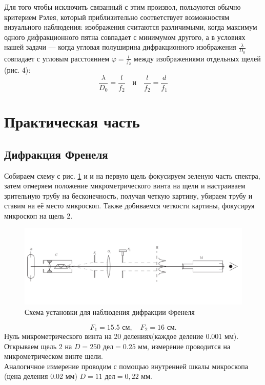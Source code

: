 \documentclass[a4paper, 12pt]{article}
\begin{document}
	Для того чтобы исключить связанный с этим произвол, пользуются обычно критерием Рэлея, который приблизительно соответствует возможностям визуального наблюдения: изображения считаются различимыми, когда максимум одного дифракционного пятна совпадает с минимумом другого, а в условиях нашей задачи — когда угловая полуширина дифракционного изображения $\frac{\lambda}{D_0}$ совпадает с угловым расстоянием $\varphi = \frac{l}{f_2}$ между изображениями отдельных щелей (рис. 4):
	\begin{equation*}
		\frac{\lambda}{D_0}=\frac{l}{f_2}\quad\text{и}\quad\frac{l}{f_2}=\frac{d}{f_1}
	\end{equation*}
	\section{Практическая часть}
	\subsection{Дифракция Френеля}
	Собираем схему с рис. \ref{exp_scheme_1} и и на первую щель фокусируем зеленую часть спектра, затем отмеряем положение микрометрического винта на щели и настраиваем зрительную трубу на бесконечность, получая четкую картину, убираем трубу и ставим на её место микроскоп. Также добиваемся четкости картины, фокусируя микроскоп на щель 2.
	\begin{figure}[h]
		\includegraphics[scale=0.55]{scheme1.pdf}
		\caption{Схема установки для наблюдения дифракции Френеля}
		\label{exp_scheme_1}
	\end{figure}
	\begin{equation*}
		F_1=15.5\text{ см}, \quad F_2=16\text{ см}.
	\end{equation*}
	Нуль микрометрического винта на 20 делениях(каждое деление 0.001 мм).
	Открываем щель 2 на $D=250\text{ дел}=0.25 \text{ мм}$, измерение проводится на микрометрическом винте щели.\\
	Аналогичное измерение проводим с помощью внутренней шкалы микроскопа (цена деления 0.02 мм) $D=11 \text{ дел}=0,22 \text{ мм}$.\\
\end{document}
